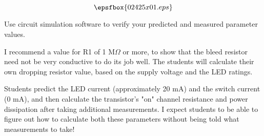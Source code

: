 

$$\epsfbox{02425x01.eps}$$

\vfil \eject






Use circuit simulation software to verify your predicted and measured parameter values.







I recommend a value for R1 of 1 M$\Omega$ or more, to show that the bleed resistor need not be very conductive to do its job well.  The students will calculate their own dropping resistor value, based on the supply voltage and the LED ratings.

Students predict the LED current (approximately 20 mA) and the switch current (0 mA), and then calculate the transistor's "on" channel resistance and power dissipation after taking additional measurements.  I expect students to be able to figure out how to calculate both these parameters without being told what measurements to take!




